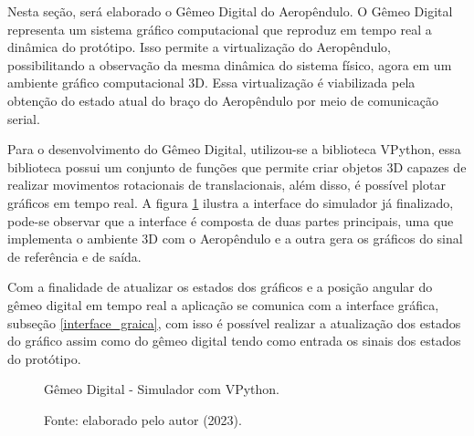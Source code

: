 Nesta seção, será elaborado o Gêmeo Digital do Aeropêndulo. O Gêmeo Digital representa um sistema gráfico computacional que reproduz em tempo real a dinâmica do protótipo. Isso permite a virtualização do Aeropêndulo, possibilitando a observação da mesma dinâmica do sistema físico, agora em um ambiente gráfico computacional 3D. Essa virtualização é viabilizada pela obtenção do estado atual do braço do Aeropêndulo por meio de comunicação serial.

Para o desenvolvimento do Gêmeo Digital, utilizou-se a biblioteca VPython, essa biblioteca possui um conjunto de funções que permite criar objetos 3D capazes de realizar movimentos rotacionais de translacionais, além disso, é possível plotar gráficos em tempo real. A figura \ref{fig3:image_13_1} ilustra a interface do simulador já finalizado, pode-se observar que a interface é composta de duas partes principais, uma que implementa o ambiente 3D com o Aeropêndulo e a outra gera os gráficos do sinal de referência e de saída.

Com a finalidade de atualizar os estados dos gráficos e a posição angular do gêmeo digital em tempo real a aplicação se comunica com a interface gráfica, subseção \ref{interface_graica}, com isso é possível realizar a atualização dos estados do gráfico assim como do gêmeo digital tendo como entrada os sinais dos estados do protótipo.

\begin{figure}[!h]
	\centering
	\caption{Gêmeo Digital - Simulador com VPython.}
        \vspace{0.001cm}
	\caption*{Fonte: elaborado pelo autor (2023).}
	\label{fig3:image_13_1}
\end{figure}


